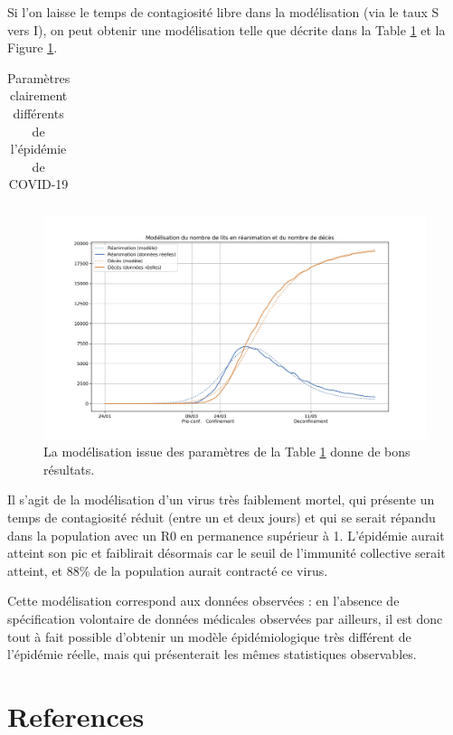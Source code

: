 \documentclass[review]{elsarticle}
\begin{document}
Si l'on laisse le temps de contagiosité libre dans la modélisation (via le taux S vers I), on peut obtenir une modélisation telle que décrite dans la Table \ref{table:faux} et la Figure \ref{figure:faux}.

\begin{table}
\small
\begin{center}
\begin{tabular}{|c|c|}
    \hline
 
      \hline
\end{tabular}
\end{center}
\caption{Paramètres clairement différents de l'épidémie de COVID-19}
\label{table:faux}
\end{table}

\begin{figure}
\begin{center}
\includegraphics[width=1\linewidth]{figures/faux.jpg}
\end{center}
\caption{La modélisation issue des paramètres de la Table \ref{table:faux} donne de bons résultats.}
\label{figure:faux}
\end{figure}

Il s'agit de la modélisation d'un virus très faiblement mortel, qui présente un temps de contagiosité réduit (entre un et deux jours) et qui se serait répandu dans la population avec un R0 en permanence supérieur à 1. L'épidémie aurait atteint son pic et faiblirait désormais car le seuil de l'immunité collective serait atteint, et 88\% de la population aurait contracté ce virus.

Cette modélisation correspond aux données observées : en l'absence de spécification volontaire de données médicales observées par ailleurs, il est donc tout à fait possible d'obtenir un modèle épidémiologique très différent de l'épidémie réelle, mais qui présenterait les mêmes statistiques observables.

\section*{References}


\nocite{*}
\end{document}
